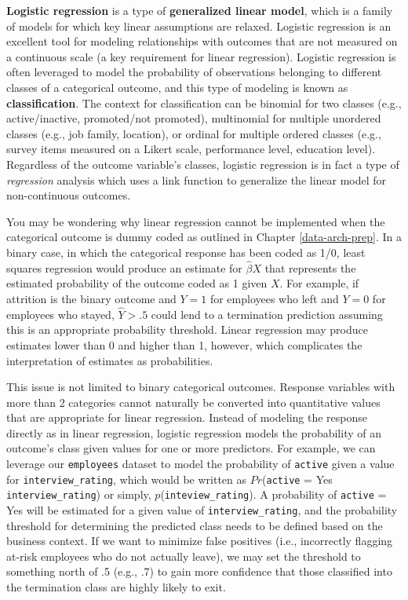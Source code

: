 \documentclass[
]{book}
\begin{document}
\textbf{Logistic regression} is a type of \textbf{generalized linear model}, which is a family of models for which key linear assumptions are relaxed. Logistic regression is an excellent tool for modeling relationships with outcomes that are not measured on a continuous scale (a key requirement for linear regression). Logistic regression is often leveraged to model the probability of observations belonging to different classes of a categorical outcome, and this type of modeling is known as \textbf{classification}. The context for classification can be binomial for two classes (e.g., active/inactive, promoted/not promoted), multinomial for multiple unordered classes (e.g., job family, location), or ordinal for multiple ordered classes (e.g., survey items measured on a Likert scale, performance level, education level). Regardless of the outcome variable's classes, logistic regression is in fact a type of \emph{regression} analysis which uses a link function to generalize the linear model for non-continuous outcomes.

You may be wondering why linear regression cannot be implemented when the categorical outcome is dummy coded as outlined in Chapter \ref{data-arch-prep}. In a binary case, in which the categorical response has been coded as 1/0, least squares regression would produce an estimate for \(\hat\beta X\) that represents the estimated probability of the outcome coded as 1 given \(X\). For example, if attrition is the binary outcome and \(Y = 1\) for employees who left and \(Y = 0\) for employees who stayed, \(\hat Y > .5\) could lend to a termination prediction assuming this is an appropriate probability threshold. Linear regression may produce estimates lower than 0 and higher than 1, however, which complicates the interpretation of estimates as probabilities.

This issue is not limited to binary categorical outcomes. Response variables with more than 2 categories cannot naturally be converted into quantitative values that are appropriate for linear regression. Instead of modeling the response directly as in linear regression, logistic regression models the probability of an outcome's class given values for one or more predictors. For example, we can leverage our \texttt{employees} dataset to model the probability of \texttt{active} given a value for \texttt{interview\_rating}, which would be written as \(Pr\)(\texttt{active} = Yes \textbar{} \texttt{interview\_rating}) or simply, \(p\)(\texttt{inteview\_rating}). A probability of \texttt{active} = Yes will be estimated for a given value of \texttt{interview\_rating}, and the probability threshold for determining the predicted class needs to be defined based on the business context. If we want to minimize false positives (i.e., incorrectly flagging at-risk employees who do not actually leave), we may set the threshold to something north of .5 (e.g., .7) to gain more confidence that those classified into the termination class are highly likely to exit.
\end{document}
